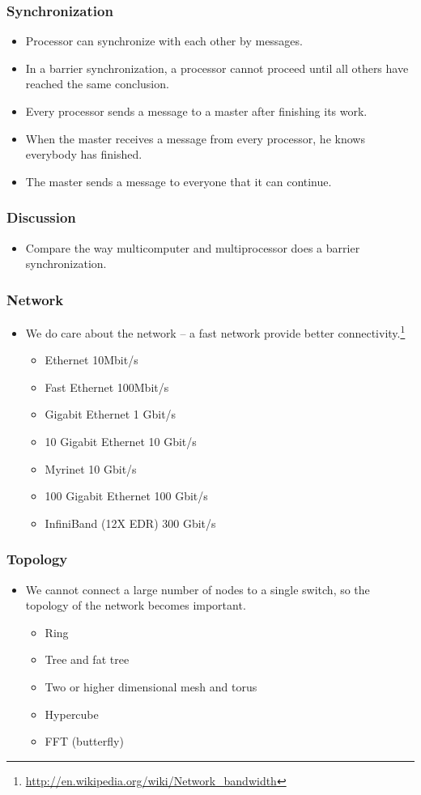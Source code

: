\documentclass{beamer}
\begin{document}
\begin{CJK}{UTF8}{bsmi}
\begin{frame}
\frametitle{Synchronization}
\begin{itemize}
\item Processor can synchronize with each other by messages.
\item In a barrier synchronization, a processor cannot proceed until
  all others have reached the same conclusion.
\item Every processor sends a message to a master after finishing its work.
\item When the master receives a message from every processor, he knows everybody has finished.
\item The master sends a message to everyone that it can continue.
\end{itemize}
\end{frame}

\begin{frame}
\frametitle{Discussion}
\begin{itemize}
\item Compare the way multicomputer and multiprocessor does a barrier
 synchronization.
\end{itemize}
\end{frame}



\begin{frame}
\frametitle{Network}
\begin{itemize}
\item We do care about the network -- a fast network provide better
  connectivity.\footnote{\url{http://en.wikipedia.org/wiki/Network_bandwidth}}
\begin{itemize}
\item Ethernet 10Mbit/s
\item Fast Ethernet 100Mbit/s
\item Gigabit Ethernet 1 Gbit/s
\item 10 Gigabit Ethernet 10  Gbit/s
\item Myrinet 10 Gbit/s
\item 100 Gigabit Ethernet 100 Gbit/s
\item InfiniBand (12X EDR) 300 Gbit/s
\end{itemize}

\end{itemize}
\end{frame}

\begin{frame}
\frametitle{Topology}
\begin{itemize}
\item We cannot connect a large number of nodes to a single switch, so
  the topology of the network becomes important.
\begin{itemize}
\item Ring
\item Tree and fat tree
\item Two or higher dimensional mesh and torus
\item Hypercube
\item FFT (butterfly)
\end{itemize}
\end{itemize}
\end{frame}


\end{CJK}
\end{document}
